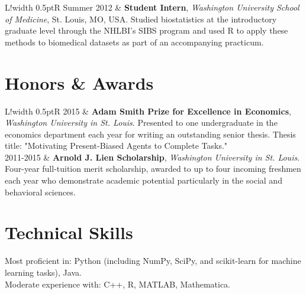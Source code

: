 \documentclass[10pt]{article}
\newcommand\VRule{\color{lightgray}\vrule width 0.5pt}
\begin{document}
\begin{tabular}{L!{\VRule}R}
Summer 2012 & {\textbf{Student Intern}, \emph{Washington University School of Medicine}, St. Louis, MO, USA}.
\newline
Studied biostatistics at the introductory graduate level through the NHLBI's SIBS program and used R to apply these methods to biomedical datasets as part of an accompanying practicum.  
\end{tabular}

\section*{Honors \& Awards}
\begin{tabular}{L!{\VRule}R}
2015 & \textbf{Adam Smith Prize for Excellence in Economics}, \emph{Washington University in St. Louis}.
\newline Presented to one undergraduate in the economics department each year for writing an outstanding senior thesis.  Thesis title: "Motivating Present-Biased Agents to Complete Tasks."
\\

2011-2015 & \textbf{Arnold J. Lien Scholarship}, \emph{Washington University in St. Louis}.
\newline Four-year full-tuition merit scholarship, awarded to up to four incoming freshmen each year who demonstrate academic potential particularly in the social and behavioral sciences.  
\\
\end{tabular}

\section*{Technical Skills}
Most proficient in: Python (including NumPy, SciPy, and scikit-learn for machine learning tasks), Java.  \\
Moderate experience with: C++, R, MATLAB, Mathematica. 
\end{document}
